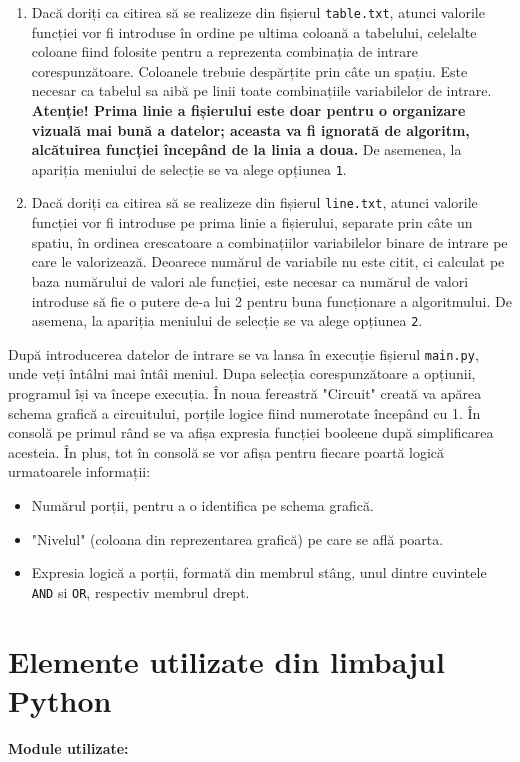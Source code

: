 \documentclass{article}
\begin{document}
\begin{enumerate}
    \item Dacă doriți ca citirea să se realizeze din fișierul \verb|table.txt|, atunci valorile funcției vor fi introduse în ordine pe ultima coloană a tabelului, celelalte coloane fiind folosite pentru a reprezenta combinația de intrare corespunzătoare. Coloanele trebuie despărțite prin câte un spațiu. Este necesar ca tabelul sa aibă pe linii toate combinațiile variabilelor de intrare. \textbf{Atenție! Prima linie a fișierului este doar pentru o organizare vizuală mai bună a datelor; aceasta va fi ignorată de algoritm, alcătuirea funcției începând de la linia a doua.} De asemenea, la apariția meniului de selecție se va alege opțiunea \verb|1|.
    \item Dacă doriți ca citirea să se realizeze din fișierul \verb|line.txt|, atunci valorile funcției vor fi introduse pe prima linie a fișierului, separate prin câte un spatiu, în ordinea crescatoare a combinațiilor variabilelor binare de intrare pe care le valorizează. Deoarece numărul de variabile nu este citit, ci calculat pe baza numărului de valori ale funcției, este necesar ca numărul de valori introduse să fie o putere de-a lui 2 pentru buna funcționare a algoritmului. De asemena, la apariția meniului de selecție se va alege opțiunea \verb|2|.
\end{enumerate}

După introducerea datelor de intrare se va lansa în execuție fișierul \verb|main.py|, unde veți întâlni mai întâi meniul. Dupa selecția corespunzătoare a opțiunii, programul își va începe execuția. În noua fereastră "Circuit" creată va apărea schema grafică a circuitului, porțile logice fiind numerotate începând cu 1. În consolă pe primul rând se va afișa expresia funcției booleene după simplificarea acesteia. În plus, tot în consolă se vor afișa pentru fiecare poartă logică urmatoarele informații:

\begin{itemize}
    \item Numărul porții, pentru a o identifica pe schema grafică.
    \item "Nivelul" (coloana din reprezentarea grafică) pe care se află poarta.
    \item Expresia logică a porții, formată din membrul stâng, unul dintre cuvintele \verb|AND| si \verb|OR|, respectiv membrul drept.
\end{itemize}

\section*{Elemente utilizate din limbajul Python}
\hspace{0.5cm}\textbf{Module utilizate:}
\end{document}
